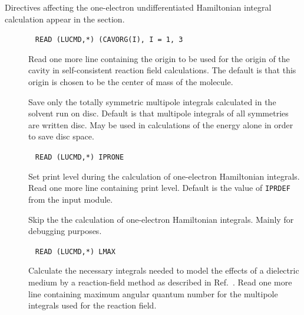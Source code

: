 Directives affecting the one-electron undifferentiated Hamiltonian
integral calculation appear in the  section.
\begin{description}
\item[]\verb| |\newline
\verb|READ (LUCMD,*) (CAVORG(I), I = 1, 3|

Read one more line containing the origin to be used for the origin of
the cavity in self-consistent reaction field
calculations. The default
is that this origin is chosen to be the center of mass of the molecule.

\item[] Save only the totally symmetric multipole integrals
calculated in the solvent run on disc. Default is that multipole
integrals of all symmetries are written disc. May be used in
calculations of the energy alone in order to save disc space.

\item[]\verb| |\newline
\verb|READ (LUCMD,*) IPRONE|

Set print level during the calculation of one-electron Hamiltonian
integrals.  Read one more line containing print level. Default is
the value of \verb|IPRDEF| from the  input module.

\item[] Skip the the calculation of one-electron Hamiltonian
integrals. Mainly for debugging purposes.

\item[]\verb| |\newline
\verb|READ (LUCMD,*) LMAX|


Calculate the necessary integrals needed to model the effects of a
dielectric medium by a
reaction-field method as
described in
Ref.~\cite{kvmhahjajthjcp89}.  Read one more line containing maximum
angular quantum
number for the multipole integrals used for
the reaction field.
\end{description}

